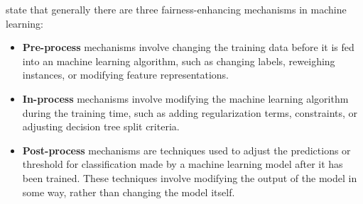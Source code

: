 \documentclass[
	12pt,
    a4paper,
    egregdoesnotlikesansseriftitles, %
    toc=chapterentrywithdots,
    oneside, openany,
    titlepage,
    parskip=half,
    headings=normal,  %
    listof=totoc,
    bibliography=totocnumbered,
    index=totoc,
    captions=tableheading,  %
    listof=flat,
    numbers=noenddot, %
    final]
    {scrbook}
\begin{document}
\textcite[p. 8-.10]{fairness} state that generally there are three fairness-enhancing mechanisms in machine learning: 
\begin{itemize}
 \item \textbf{Pre-process} mechanisms involve changing the training data before it is fed into an machine learning algorithm, such as changing labels, reweighing instances, or modifying feature representations.
 \item \textbf{In-process} mechanisms involve modifying the machine learning algorithm during the training time, such as adding regularization terms, constraints, or adjusting decision tree split criteria.
 \item \textbf{Post-process} mechanisms are techniques used to adjust the predictions or threshold for classification made by a machine learning model after it has been trained. These techniques involve modifying the output of the model in some way, rather than changing the model itself.
\end{itemize}

%


%
\end{document}
